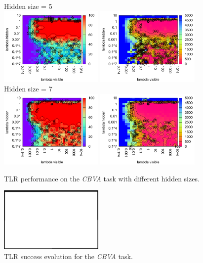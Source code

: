 \begin{figure}[H]
  Hidden size = 5 \\
  \includegraphics[width=0.45\textwidth]{img/k3/tlr-5-success.pdf} 
  \includegraphics[width=0.45\textwidth]{img/k3/tlr-5-epoch.pdf}  
  Hidden size = 7 \\
  \includegraphics[width=0.45\textwidth]{img/k3/tlr-7-success.pdf} 
  \includegraphics[width=0.45\textwidth]{img/k3/tlr-7-epoch.pdf}    
  \caption{TLR performance on the \emph{CBVA} task with different hidden sizes.}
  \label{fig:results-tlr-k3-success}
\end{figure}

\begin{figure}[H]
  \centering
  \includegraphics[width=0.45\textwidth]{img/placeholder.png}  %
  \caption{TLR success evolution for the \emph{CBVA} task.}
  \label{fig:results-tlr-k3-epoch} 
\end{figure}

